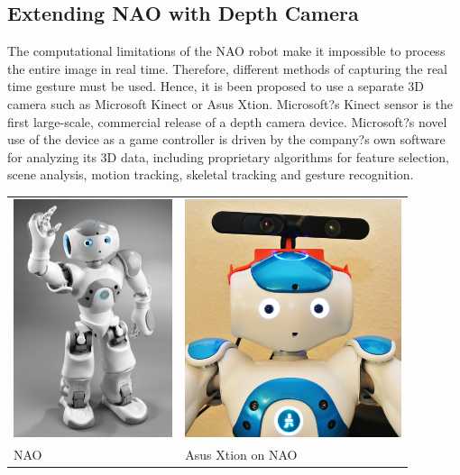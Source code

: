 \subsection{Extending NAO with Depth Camera} The computational limitations of the NAO robot make it impossible to process the entire image in real time. Therefore, different methods of capturing the real time gesture must be used. Hence, it is been proposed to use a separate 3D camera such as Microsoft Kinect or Asus Xtion. Microsoft?s Kinect sensor is the first large-scale, commercial release of a depth camera device. Microsoft?s novel use of the device as a game controller is driven by the company?s own software for analyzing its 3D data, including proprietary algorithms for feature selection, scene analysis, motion tracking, skeletal tracking and gesture recognition. 
\begin{table}
	[h] \centering 
	\begin{tabular}
		{ll} 
		\includegraphics[height=7cm]{figures/nao.png} & 
		\includegraphics[height=7cm]{figures/nao-xtion.png} \\
		NAO & Asus Xtion on NAO 
	\end{tabular}
\end{table}

